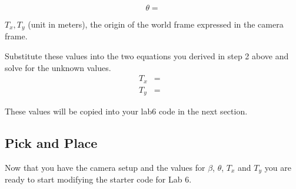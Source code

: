 \begin{enumerate}
	\[
	\theta = 
	\]
	
	$T_x, T_y$ (unit in meters), the origin of the world frame expressed in the camera frame. 
	
	Substitute these values into the two equations you derived in step 2 above and solve for the unknown values.
	\begin{eqnarray*}
		T_x & = & \\
		T_y & = & 	
	\end{eqnarray*}
	
	These values will be copied into your lab6 code in the next section.
\end{enumerate}

\subsection{Pick and Place} \label{PickPlace}

Now that you have the camera setup and the values for $\beta$, $\theta$, $T_x$ and $T_y$ you are ready to start modifying the starter code for Lab 6. 


